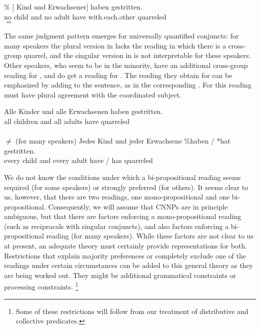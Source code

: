 \documentclass[output=paper]{langsci/langscibook}
\begin{document}
\ea \label{ex-eltern3}
\gll \% [ Kind und  Erwachsener] haben  gestritten.\\
{} \hphantom{[}no child and no adult have with.each.other quarreled\\
\glt $=$ 
\z

The same judgment pattern emerges for universally quantified conjuncts: for many speakers the plural version in  lacks the reading in which there is a cross-group quarrel, and the singular version in  is not interpretable for these speakers. Other speakers, who seem to be in the minority, have an additional cross-group reading for , and do get a reading for . The reading they obtain for  can be emphasized by adding  to the sentence, as in the corresponding . For this reading  must have plural agreement with the coordinated subject.

\ea \label{ex-eltern-all}
\gll Alle Kinder und alle Erwachsenen haben gestritten.\\
all children and all adults have quarreled\\
\glt {}\\
\glt $\not=$  (for many speakers)
\ex \label{ex-eltern-jed}
\gll Jedes Kind und jeder Erwachsene \%haben / *hat gestritten.\\
every child and every adult \hphantom{\%}have / \hphantom{*}has quarreled\\
\z 

We do not know the conditions under which a bi-pro\-po\-si\-tional reading seems required (for some speakers) or strongly preferred (for others). 
It seems clear to us, however, that there are two readings, one mono-propositional and one bi-pro\-po\-si\-tional. 
Consequently, we will assume that CNNPs are in principle ambiguous, but that there are factors enforcing a mono-propositional reading (such as reciprocals with singular conjuncts), and also factors enforcing a bi-propositional reading (for many speakers). 
While these factors are not clear to us at present, an adequate theory must certainly provide representations for both. 
Restrictions that explain majority preferences or completely exclude one of the readings under certain circumstances can be added to this general theory as they are being worked out. They might be additional grammatical constraints or processing constraints.%
\footnote{Some of these restrictions will follow from our treatment of distributive and collective predicates.}
\end{document}
